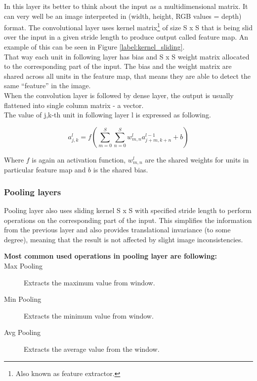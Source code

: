 \documentclass[thesis=M,english]{FITthesis}[2019/03/06]
\begin{document}
In this layer its better to think about the input as a
multidimensional matrix. It can very well be an image interpreted in (width, height, RGB values = depth) format. The convolutional layer uses kernel matrix\footnote{Also known as feature extractor.} of size S x S that is being slid over the input in a given stride length to produce output called feature map. An example of this can be seen in Figure \ref{label:kernel_sliding}. \\



That way each unit in following layer has bias and S x S weight matrix allocated to the corresponding part of the input. The bias and the weight matrix are shared across all units in the feature map, that means they are able to detect the same \enquote{feature} in the image.\\

When the convolution layer is followed by dense layer, the output is usually flattened into single column matrix - a vector. \\

The value of j,k-th unit in following layer l is expressed as following.

$$ a^{l}_{j,k} = f(\sum^S_{m=0} \sum^S_{n=0} w^l_{m,n} a^{l-1}_{j+m, k+n} + b) $$

Where \(f\) is again an activation function, \(w^l_{m,n}\) are the shared weights for units in particular feature map and \(b\) is the shared bias.



\subsubsection{Pooling layers}
Pooling layer also uses sliding kernel S x S with specified stride length to perform operations on the corresponding part of the input. This simplifies the information from the previous layer and also provides translational invariance (to some degree), meaning that the result is not affected by slight image inconsistencies.\\


\begin{description}
    \item [\textbf{Most common used operations in pooling layer are following:}]
    \item [Max Pooling] Extracts the maximum value from window.
    \item [Min Pooling] Extracts the minimum value from window.
    \item [Avg Pooling] Extracts the average value from the window.
    \end{description}
    
\end{document}

